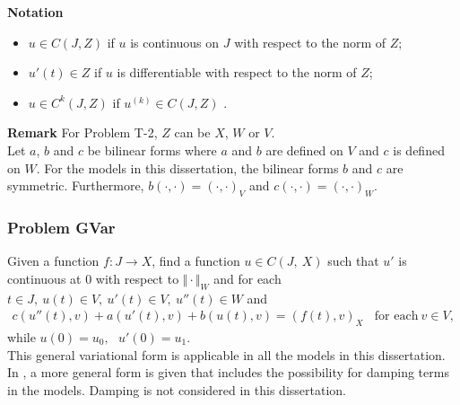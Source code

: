\documentclass[../../main.tex]{subfiles}
\begin{document}
\textbf{Notation}
\begin{itemize}
	\item[] $u\in C(J,Z)$ if $u$ is continuous on $J$ with respect to the norm of $Z$;

	\item[] $u'(t)\in Z$ if $u$ is differentiable with respect to the norm of $Z$;

	\item[] $u\in C^{k}(J,Z)$ if $u^{(k)}\in C(J,Z)$ .
\end{itemize}

\textbf{Remark} For Problem T-2, $Z$ can be $X$, $W$ or $V$.\\

Let $a$, $b$ and $c$ be bilinear forms where $a$ and $b$ are defined on $V$ and $c$ is defined on $W$. For the models in this dissertation, the bilinear forms $b$ and $c$ are symmetric. Furthermore, $b(\cdot, \cdot) = (\cdot, \cdot)_V$ and $c(\cdot, \cdot) = (\cdot, \cdot)_W$.


\subsubsection*{Problem GVar}\label{sssec:existence:ProblemGVar}
Given a function $f:J\rightarrow X$, find a function $u\in C(J,\ X)$ such that $u'$ is continuous at $0$ with respect to $\Vert \cdot \Vert_{W}$ and for each $t\in J,\ u(t)\in V,\ u'(t) \in V,\ u''(t)\in W$ and
\begin{eqnarray}
	c(u''(t),v)+a(u'(t),v)+b(u(t),v)= (f(t),v)_{X} \ \ \ \ \textrm{for each} \ v \in V, \label{eq:existence:ProblemGVar}
\end{eqnarray}
while $u(0)=u_{0},\ \ \ u'(0)=u_{1}$.\\

This general variational form is applicable in all the models in this dissertation. In \cite{VV02}, a more general form is given that includes the possibility for damping terms in the models. Damping is not considered in this dissertation.
\end{document}
